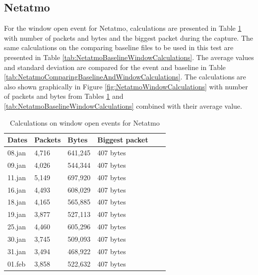 \newpage
\subsection{Netatmo}
For the window open event for Netatmo, calculations are presented in Table \ref{tab:NetatmoWindowCalculations} with number of packets and bytes and the biggest packet during the capture. The same calculations on the comparing baseline files to be used in this test are presented in Table \ref{tab:NetatmoBaselineWindowCalculations}. The average values and standard deviation are compared for the event and baseline in Table \ref{tab:NetatmoComparingBaselineAndWindowCalculations}. The calculations are also shown graphically in Figure \ref{fig:NetatmoWindowCalculations} with number of packets and bytes from Tables \ref{tab:NetatmoWindowCalculations} and \ref{tab:NetatmoBaselineWindowCalculations} combined with their average value. 

\begin{table}[H]
    \centering
    \caption{Calculations on window open events for Netatmo}
    \begin{tabular}{|l|l|l|l|l|l|}
    \hline
        \textbf{Dates} & \textbf{Packets} & \textbf{Bytes} & \textbf{Biggest packet} \\ \hline
        08.jan & 4,716 & 641,245 & 407 bytes\\ \hline
        09.jan & 4,026 & 544,344 & 407 bytes \\ \hline
        11.jan & 5,149 & 697,920 & 407 bytes\\ \hline
        16.jan & 4,493 & 608,029 & 407 bytes\\ \hline
        18.jan & 4,165 & 565,885 & 407 bytes\\ \hline
        19.jan & 3,877 & 527,113 & 407 bytes \\ \hline
        25.jan & 4,460 & 605,296 & 407 bytes \\ \hline
        30.jan & 3,745 & 509,093 & 407 bytes \\ \hline
        31.jan & 3,494 & 468,922 & 407 bytes \\ \hline
        01.feb & 3,858 & 522,632 & 407 bytes \\ \hline
    \end{tabular}
    \label{tab:NetatmoWindowCalculations}
\end{table}

